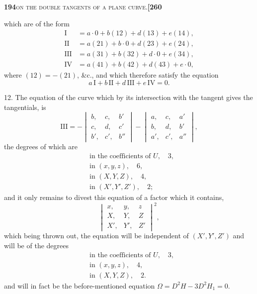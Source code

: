 \documentclass[11pt]{article}
\begin{document}
\newpage

\noindent\textbf{194}\hfill\textsc{on the double tangents of a plane curve.}\hfill\textbf{[260}

\medskip

\noindent which are of the form
\[
\begin{aligned}
\mathrm{I} &= a\cdot 0 + b(12) + d(13) + e(14),\\
\mathrm{II} &= a(21) + b\cdot 0 + d(23) + e(24),\\
\mathrm{III} &= a(31) + b(32) + d\cdot 0 + e(34),\\
\mathrm{IV} &= a(41) + b(42) + d(43) + e\cdot 0,
\end{aligned}
\]
where $(12) = -(21)$, \&c., and which therefore satisfy the equation
\[
a\,\mathrm{I} + b\,\mathrm{II} + d\,\mathrm{III} + e\,\mathrm{IV} = 0.
\]

\medskip

12. The equation of the curve which by its intersection with the tangent gives the tangentials, is
\[
\mathrm{III} = -\begin{vmatrix} b, & c, & b'\\ c, & d, & c'\\ b', & c', & b'' \end{vmatrix} - \begin{vmatrix} a, & c, & a'\\ b, & d, & b'\\ a', & c', & a'' \end{vmatrix},
\]
the degrees of which are
\[
\begin{aligned}
&\text{in the coefficients of } U,\quad 3,\\
&\text{in } (x, y, z),\quad 6,\\
&\text{in } (X, Y, Z),\quad 4,\\
&\text{in } (X', Y', Z'),\quad 2;
\end{aligned}
\]
and it only remains to divest this equation of a factor which it contains,
\[
\begin{vmatrix} x, & y, & z\\ X, & Y, & Z\\ X', & Y', & Z' \end{vmatrix}^2,
\]
which being thrown out, the equation will be independent of $(X', Y', Z')$ and will be of the degrees
\[
\begin{aligned}
&\text{in the coefficients of } U,\quad 3,\\
&\text{in } (x, y, z),\quad 4,\\
&\text{in } (X, Y, Z),\quad 2.
\end{aligned}
\]
and will in fact be the before-mentioned equation $\Omega = D^2H - 3D^2H_1 = 0$.
\end{document}

